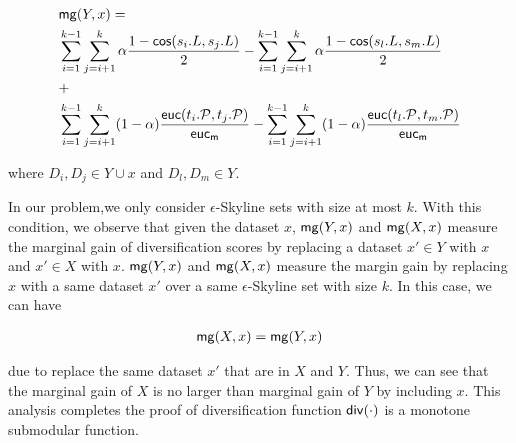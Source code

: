 \begin{small}
\begin{equation*}
\begin{aligned}
&{\mathsf{mg}}(Y,x) = \\
&\sum_{i=1}^{k-1} \sum_{j=i+1}^{k} \alpha\frac{1-{\mathsf{cos}}(s_i.L, s_j.L)}{2} - \sum_{i=1}^{k-1} \sum_{j=i+1}^{k} \alpha\frac{1-{\mathsf{cos}}(s_l.L, s_m.L)}{2}\\
&+ \\
&\sum_{i=1}^{k-1} \sum_{j=i+1}^{k}(1-\alpha)\frac{{\mathsf{euc}}(t_i.{\mathcal P}, t_j.{\mathcal P})}{{\mathsf{euc_{m}}}} - \sum_{i=1}^{k-1} \sum_{j=i+1}^{k}(1-\alpha)\frac{{\mathsf{euc}}(t_l.{\mathcal P}, t_m.{\mathcal P})}{{\mathsf{euc_{m}}}}\\
\end{aligned}
\end{equation*}
\end{small}
where $D_i, D_j \in Y \cup x$ and $D_l, D_m \in Y$.


In our problem,we only consider $\epsilon$-Skyline sets with size 
at most $k$. With this condition, we observe that
given the dataset $x$, ${\mathsf{mg}}(Y,x)$ and 
${\mathsf{mg}}(X,x)$ measure the marginal gain of 
diversification scores by replacing
a dataset $x' \in Y$ with $x$ and
$x' \in X$ with $x$. ${\mathsf{mg}}(Y,x)$ and 
${\mathsf{mg}}(X,x)$ measure the margin gain by replacing $x$ with a same dataset $x'$ 
over a same $\epsilon$-Skyline set with size $k$.
In this case, we can have
\begin{small}
\begin{equation*}
\begin{aligned}
{\ensuremath{\mathsf{mg}}}(X,x)  = {\mathsf{mg}}(Y,x)
\end{aligned}
\end{equation*}
\end{small}
due to \divmodis replace the
same dataset $x'$ that are in $X$ and $Y$. Thus, we can see that
the marginal gain of $X$ is no larger than marginal gain of $Y$
by including $x$.
This analysis completes the proof of diversification function ${\mathsf{div}}(\cdot)$ is a monotone submodular function.



